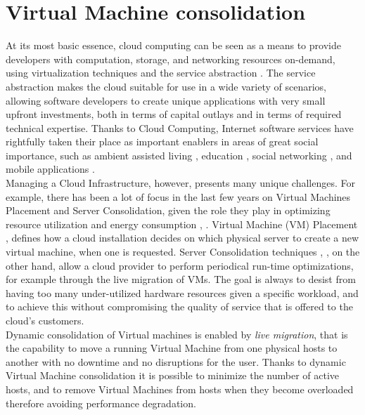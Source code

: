 
\section{Virtual Machine consolidation}
\label{sec:sota_vm_cons}

At its most basic essence, cloud computing can be seen as a means to provide developers with computation, storage, and networking resources on-demand, using virtualization techniques and the service abstraction \cite{Armbrust:2010ee}. The service abstraction makes the cloud suitable for use in a wide variety of scenarios, allowing software developers to create unique applications with very small upfront investments, both in terms of capital outlays and in terms of required technical expertise. Thanks to Cloud Computing, Internet software services have rightfully taken their place as important enablers in areas of great social importance, such as ambient assisted living \cite{Zhang:2011dq}, education \cite{Sultan:2010fd}, social networking \cite{Chard:2010eh}, and mobile applications \cite{Fernando:2013ip}.\\
Managing a Cloud Infrastructure, however, presents many unique challenges. For example, there has been a lot of focus in the last few years on Virtual Machines Placement and Server Consolidation, given the role they play in optimizing resource utilization and energy consumption \cite{Feller:2012kf}, \cite{Goudarzi:2012gw}. Virtual Machine (VM) Placement \cite{Meng:2010im}, \cite{Xu:2010df} defines how a cloud installation decides on which physical server to create a new virtual machine, when one is requested. Server Consolidation techniques \cite{Wuhib:2012vq}, \cite{Corradi:2014fe}, on the other hand, allow a cloud provider to perform periodical run-time optimizations, for example through the live migration of VMs. The goal is always to desist from having too many under-utilized hardware resources given a specific workload, and to achieve this without compromising the quality of service that is offered to the cloud’s customers.\\
Dynamic consolidation of Virtual machines is enabled by \textit{live migration}, that is the capability to move a running Virtual Machine from one physical hosts to another with no downtime and no disruptions for the user. Thanks to dynamic Virtual Machine consolidation it is possible to minimize the number of active hosts, and to remove Virtual Machines from hosts when they become overloaded therefore avoiding performance degradation.

